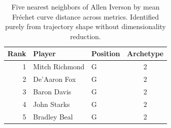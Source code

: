 \begin{table}[htbp]
  \centering\small
  \begin{tabular}{rllc}
    \toprule
    Rank & Player & Position & Archetype \\
    \midrule
    1 & Mitch Richmond & G & 2 \\
    2 & De'Aaron Fox & G & 2 \\
    3 & Baron Davis & G & 2 \\
    4 & John Starks & G & 2 \\
    5 & Bradley Beal & G & 2 \\
    \bottomrule
  \end{tabular}
  \caption{Five nearest neighbors of Allen Iverson by mean Fr\'{e}chet curve distance across metrics. Identified purely from trajectory shape without dimensionality reduction.}
  \label{tab:Allen_Iverson_frechet_curve_neighbors}
\end{table}

